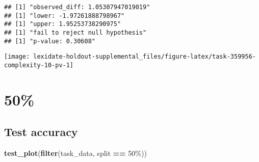 \documentclass[
]{book}
\newenvironment{Shaded}{\begin{snugshade}}{\end{snugshade}}
\newcommand{\AttributeTok}[1]{\textcolor[rgb]{0.13,0.29,0.53}{#1}}
\newcommand{\DecValTok}[1]{\textcolor[rgb]{0.00,0.00,0.81}{#1}}
\newcommand{\FunctionTok}[1]{\textcolor[rgb]{0.13,0.29,0.53}{\textbf{#1}}}
\newcommand{\NormalTok}[1]{#1}
\newcommand{\OtherTok}[1]{\textcolor[rgb]{0.56,0.35,0.01}{#1}}
\newcommand{\SpecialCharTok}[1]{\textcolor[rgb]{0.81,0.36,0.00}{\textbf{#1}}}
\newcommand{\StringTok}[1]{\textcolor[rgb]{0.31,0.60,0.02}{#1}}
\begin{document}
\begin{Shaded}
\end{Shaded}

\begin{verbatim}
## [1] "observed_diff: 1.05307947019019"
## [1] "lower: -1.97261888798967"
## [1] "upper: 1.95253738290975"
## [1] "fail to reject null hypothesis"
## [1] "p-value: 0.30608"
\end{verbatim}

\texttt{[image: lexidate-holdout-supplemental\_files/figure-latex/task-359956-complexity-10-pv-1]}

\hypertarget{section-27}{%
\section{50\%}\label{section-27}}

\hypertarget{test-accuracy-27}{%
\subsection{Test accuracy}\label{test-accuracy-27}}

\begin{Shaded}
\begin{Highlighting}[]
\FunctionTok{test\_plot}\NormalTok{(}\FunctionTok{filter}\NormalTok{(task\_data, split }\SpecialCharTok{==} \StringTok{\textquotesingle{}50\%\textquotesingle{}}\NormalTok{))}
\end{Highlighting}
\end{Shaded}
\end{document}

